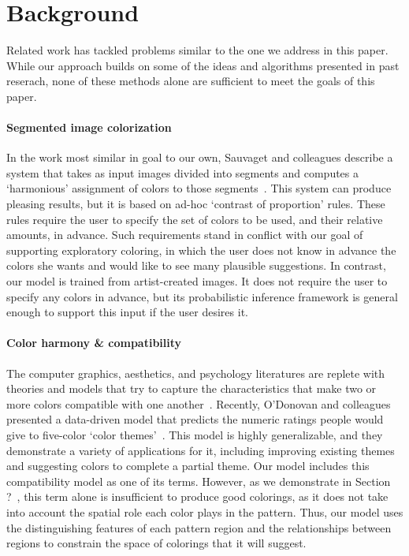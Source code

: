 \section{Background}
\label{sec:background}

Related work has tackled problems similar to the one we address in this paper. While our approach builds on some of the ideas and algorithms presented in past reserach, none of these methods alone are sufficient to meet the goals of this paper.

\paragraph{Segmented image colorization}
In the work most similar in goal to our own, Sauvaget and colleagues describe a system that takes as input images divided into segments and computes a `harmonious' assignment of colors to those segments~. This system can produce pleasing results, but it is based on ad-hoc `contrast of proportion' rules. These rules require the user to specify the set of colors to be used, and their relative amounts, in advance. Such requirements stand in conflict with our goal of supporting exploratory coloring, in which the user does not know in advance the colors she wants and would like to see many plausible suggestions. In contrast, our model is trained from artist-created images. It does not require the user to specify any colors in advance, but its probabilistic inference framework is general enough to support this input if the user desires it.

\paragraph{Color harmony \& compatibility}
The computer graphics, aesthetics, and psychology literatures are replete with theories and models that try to capture the characteristics that make two or more colors compatible with one another~\cite{CohenOrHarmonization,Munsell,PalmerColorPreference}. Recently, O'Donovan and colleagues presented a data-driven model that predicts the numeric ratings people would give to five-color `color themes'~. This model is highly generalizable, and they demonstrate a variety of applications for it, including improving existing themes and suggesting colors to complete a partial theme. Our model includes this compatibility model as one of its terms. However, as we demonstrate in Section ?~, this term alone is insufficient to produce good colorings, as it does not take into account the spatial role each color plays in the pattern. Thus, our model uses the distinguishing features of each pattern region and the relationships between regions to constrain the space of colorings that it will suggest.

